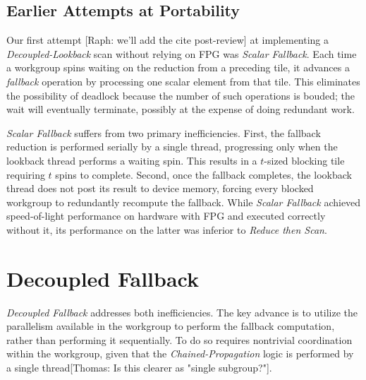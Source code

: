 \documentclass[sigconf]{acmart}
\newcommand{\thomas}[1]{{\footnotesize\color{orange}[Thomas: #1]}}
\newcommand{\raph}[1]{{\footnotesize\color{magenta}[Raph: #1]}}
\begin{document}
\subsection{Earlier Attempts at Portability}
Our first attempt \raph{we'll add the cite post-review} at implementing a \emph{Decoupled-Lookback} scan without relying on FPG was \emph{Scalar Fallback}. Each time a workgroup spins waiting on the reduction from a preceding tile, it advances a \emph{fallback} operation by processing one scalar element from that tile. This eliminates the possibility of deadlock because the number of such operations is bouded; the wait will eventually terminate, possibly at the expense of doing redundant work.

\emph{Scalar Fallback} suffers from two primary inefficiencies. First, the fallback reduction is performed serially by a single thread, progressing only when the lookback thread performs a waiting spin. This results in a $t$-sized blocking tile requiring $t$ spins to complete. Second, once the fallback completes, the lookback thread does not post its result to device memory, forcing every blocked workgroup to redundantly recompute the fallback. While \emph{Scalar Fallback} achieved speed-of-light performance on hardware with FPG and executed correctly without it, its performance on the latter was inferior to \emph{Reduce then Scan}.

\section{Decoupled Fallback}
\emph{Decoupled Fallback} addresses both inefficiencies. The key advance is to utilize the parallelism available in the workgroup to perform the fallback computation, rather than performing it sequentially. To do so requires nontrivial coordination within the workgroup, given that the \emph{Chained-Propagation} logic is performed by a single thread\thomas{Is this clearer as "single subgroup?"}.
\end{document}
